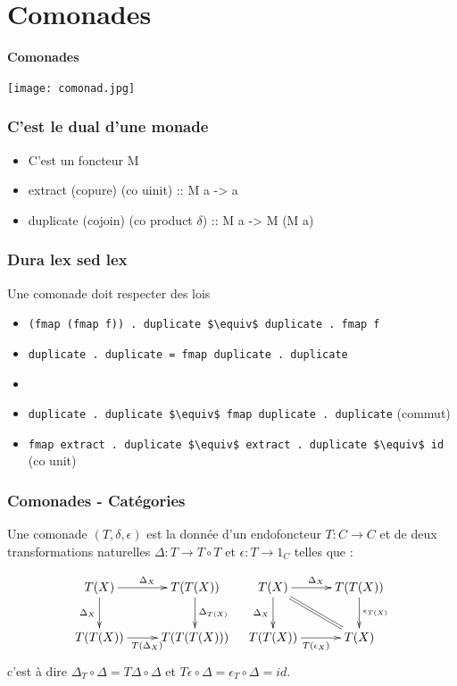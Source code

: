 \documentclass{beamer}
\begin{document}
\section{Comonades}

\begin{frame}
\begin{center}
\textbf{Comonades}
\end{center}

\begin{center}
\texttt{[image: comonad.jpg]}
\end{center}
\end{frame}

\begin{frame}
\frametitle{C'est le dual d'une monade}

\begin{itemize}
\item C'est un foncteur M
\item extract (copure) (co uinit) :: M a -> a
\item duplicate (cojoin) (co product $\delta$) :: M a -> M (M a)
\end{itemize}
\end{frame}

\begin{frame}
\frametitle{Dura lex sed lex}
\begin{alertblock}{Une comonade doit respecter des lois}
\begin{itemize}
\item \verb!(fmap (fmap f)) . duplicate $\equiv$ duplicate . fmap f!
\item \verb!duplicate . duplicate = fmap duplicate . duplicate!
\item[] \ 
\item \verb!duplicate . duplicate $\equiv$ fmap duplicate . duplicate! (commut)
\item \verb!fmap extract . duplicate $\equiv$ extract . duplicate $\equiv$ id! (co unit)
\end{itemize}
\end{alertblock}
\end{frame}


\begin{frame}
\frametitle{Comonades - Catégories}
Une comonade $(T, \delta, \epsilon)$ est la donnée d'un
endofoncteur $T : C \rightarrow C$ et de deux
transformations naturelles $\Delta : T \rightarrow T\circ T$ et $\epsilon : T \rightarrow 1_C$ telles que :

\[
\begin{array}{cc}
\xymatrix{
T(X) \ar[r]^{\Delta_X} \ar[d]_{\Delta_X} & T(T(X)) \ar[d]^{\Delta_{T(X)}} \\
T(T(X)) \ar[r]_{T(\Delta_X)} & T(T(T(X))) \\
}
&
\xymatrix{
T(X) \ar[d]_{\Delta_X} \ar[r]^{\Delta_X}  \ar@{=}[dr] & T(T(X))   \ar[d]^{\epsilon_{T(X)}} \\
T(T(X)) \ar[r]_{T(\epsilon_X)} & T(X) \\
}
\end{array}
\]
c'est à dire
$\Delta_T \circ \Delta = T \Delta \circ \Delta$
et
$T \epsilon \circ \Delta = \epsilon_T \circ \Delta = id$.
\end{frame}
\end{document}
